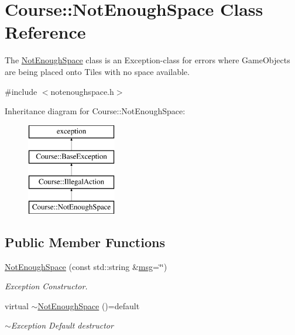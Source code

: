 \hypertarget{classCourse_1_1NotEnoughSpace}{\section{Course\-:\-:Not\-Enough\-Space Class Reference}
\label{classCourse_1_1NotEnoughSpace}
}


The \hyperlink{classCourse_1_1NotEnoughSpace}{Not\-Enough\-Space} class is an Exception-\/class for errors where Game\-Objects are being placed onto Tiles with no space available.  




{\ttfamily \#include $<$notenoughspace.\-h$>$}

Inheritance diagram for Course\-:\-:Not\-Enough\-Space\-:\begin{figure}[H]
\begin{center}
\leavevmode
\includegraphics[height=4.000000cm]{classCourse_1_1NotEnoughSpace}
\end{center}
\end{figure}
\subsection*{Public Member Functions}
\begin{DoxyCompactItemize}
\item 
\hyperlink{classCourse_1_1NotEnoughSpace_a6dd4a0d6c0ed238b82b0cec97f9d70cf}{Not\-Enough\-Space} (const std\-::string \&\hyperlink{classCourse_1_1BaseException_ac5a744a6af6f2ba9198b58e52bb62f5a}{msg}=\char`\"{}\char`\"{})
\begin{DoxyCompactList}\small\item\em Exception Constructor. \end{DoxyCompactList}\item 
virtual \hyperlink{classCourse_1_1NotEnoughSpace_a14e18509490ee441d7dce6b72eb88428}{$\sim$\-Not\-Enough\-Space} ()=default
\begin{DoxyCompactList}\small\item\em $\sim$\-Exception Default destructor \end{DoxyCompactList}\end{DoxyCompactItemize}


